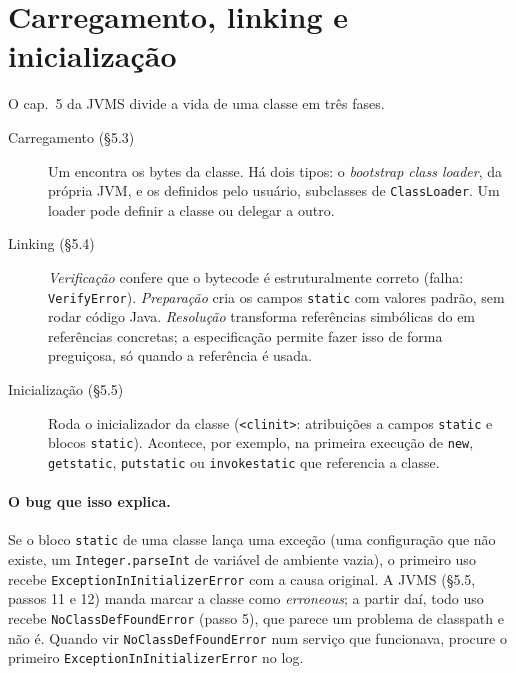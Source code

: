 \section{Carregamento, linking e inicialização}
\label{sec:class-loading}

O cap.~5 da JVMS divide a vida de uma classe em três fases.

\begin{description}
\item[Carregamento (§5.3)] Um  encontra os bytes da classe.
  Há dois tipos: o \emph{bootstrap class loader}, da própria JVM, e os
  definidos pelo usuário, subclasses de \texttt{ClassLoader}. Um loader
  pode definir a classe ou delegar a outro.
\item[Linking (§5.4)] \emph{Verificação} confere que o bytecode é
  estruturalmente correto (falha: \texttt{VerifyError}).
  \emph{Preparação} cria os campos \texttt{static} com valores padrão,
  sem rodar código Java. \emph{Resolução} transforma referências
  simbólicas do  em referências concretas; a
  especificação permite fazer isso de forma preguiçosa, só quando a
  referência é usada.
\item[Inicialização (§5.5)] Roda o inicializador da classe
  (\texttt{<clinit>}: atribuições a campos \texttt{static} e blocos
  \texttt{static}). Acontece, por exemplo, na primeira execução de
  \texttt{new}, \texttt{getstatic}, \texttt{putstatic} ou
  \texttt{invokestatic} que referencia a classe.
\end{description}

\paragraph{O bug que isso explica.}
Se o bloco \texttt{static} de uma classe lança uma exceção (uma
configuração que não existe, um \texttt{Integer.parseInt} de variável de
ambiente vazia), o primeiro uso recebe \texttt{ExceptionInInitializerError}
com a causa original. A JVMS (§5.5, passos 11 e 12) manda marcar a classe
como \emph{erroneous}; a partir daí, todo uso recebe
\texttt{NoClassDefFoundError} (passo 5), que parece um problema de
classpath e não é. Quando vir \texttt{NoClassDefFoundError} num serviço
que funcionava, procure o primeiro \texttt{ExceptionInInitializerError}
no log.

